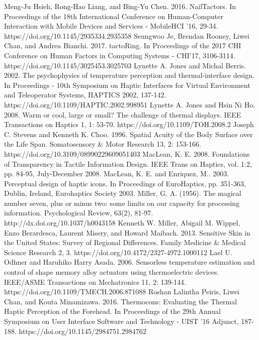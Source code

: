 \documentclass[preprint,12pt]{elsarticle}
\begin{document}
\begin{thebibliography}{00}
Meng-Ju Hsieh, Rong-Hao Liang, and Bing-Yu Chen. 2016. NailTactors. In Proceedings of the 18th International Conference on Human-Computer Interaction with Mobile Devices and Services - MobileHCI '16, 29-34. https://doi.org/10.1145/2935334.2935358
Seungwoo Je, Brendan Rooney, Liwei Chan, and Andrea Bianchi. 2017. tactoRing. In Proceedings of the 2017 CHI Conference on Human Factors in Computing Systems - CHI'17, 3106-3114. https://doi.org/10.1145/3025453.3025703
Lynette A. Jones and Michal Berris. 2002. The psychophysics of temperature perception and thermal-interface design. In Proceedings - 10th Symposium on Haptic Interfaces for Virtual Environment and Teleoperator Systems, HAPTICS 2002, 137-142. https://doi.org/10.1109/HAPTIC.2002.998951
Lynette A. Jones and Hsin Ni Ho. 2008. Warm or cool, large or small? The challenge of thermal displays. IEEE Transactions on Haptics 1, 1: 53-70. https://doi.org/10.1109/TOH.2008.2
Joseph C. Stevens and Kenneth K. Choo. 1996. Spatial Acuity of the Body Surface over the Life Span. Somatosensory \& Motor Research 13, 2: 153-166. https://doi.org/10.3109/08990229609051403
MacLean, K. E. 2008. Foundations of Transparency in Tactile Information Design. IEEE Trans on Haptics, vol. 1:2, pp. 84-95, July-December 2008.
MacLean, K. E. and Enriquez, M.. 2003. Perceptual design of haptic icons. In Proceedings of EuroHaptics, pp. 351-363, Dublin, Ireland, Eurohaptics Society 2003.
Miller, G. A. (1956). The magical number seven, plus or minus two: some limits on our capacity for processing information. Psychological Review, 63(2), 81-97. http://dx.doi.org/10.1037/h0043158
Kenneth W. Miller, Abigail M. Wippel, Enzo Berardesca, Laurent Misery, and Howard Maibach. 2013. Sensitive Skin in the United States: Survey of Regional Differences. Family Medicine \& Medical Science Research 2, 3. https://doi.org/10.4172/2327-4972.1000112
Lael U. Odhner and Haruhiko Harry Asada. 2006. Sensorless temperature estimation and control of shape memory alloy actuators using thermoelectric devices. IEEE/ASME Transactions on Mechatronics 11, 2: 139-144. https://doi.org/10.1109/TMECH.2006.871088
Roshan Lalintha Peiris, Liwei Chan, and Kouta Minamizawa. 2016. Thermocons: Evaluating the Thermal Haptic Perception of the Forehead. In Proceedings of the 29th Annual Symposium on User Interface Software and Technology - UIST '16 Adjunct, 187-188. https://doi.org/10.1145/2984751.2984762

\end{thebibliography}
\end{document}
